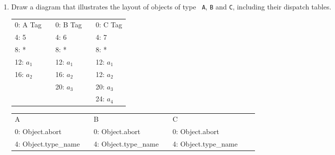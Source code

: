 \documentclass[10pt]{article}
\begin{document}
\begin{enumerate}
\begin{enumerate}
\item Draw a diagram that illustrates the layout of objects of type {\tt
A}, {\tt B} and {\tt C}, including their dispatch tables.
\begin{table}[h]
  \centering
  \begin{tabular}{llll|l|}
  \cline{1-1} \cline{3-3} \cline{5-5}
  \multicolumn{1}{|l|}{0: A Tag}  & \multicolumn{1}{l|}{} & \multicolumn{1}{l|}{0: B Tag}  &  & 0: C Tag  \\ \cline{1-1} \cline{3-3} \cline{5-5} 
  \multicolumn{1}{|l|}{4: 5}      & \multicolumn{1}{l|}{} & \multicolumn{1}{l|}{4: 6}      &  & 4: 7      \\ \cline{1-1} \cline{3-3} \cline{5-5} 
  \multicolumn{1}{|l|}{8: *}      & \multicolumn{1}{l|}{} & \multicolumn{1}{l|}{8: *}      &  & 8: *      \\ \cline{1-1} \cline{3-3} \cline{5-5} 
  \multicolumn{1}{|l|}{12: $a_1$} & \multicolumn{1}{l|}{} & \multicolumn{1}{l|}{12: $a_1$} &  & 12: $a_1$ \\ \cline{1-1} \cline{3-3} \cline{5-5} 
  \multicolumn{1}{|l|}{16: $a_2$} & \multicolumn{1}{l|}{} & \multicolumn{1}{l|}{16: $a_2$} &  & 12: $a_2$ \\ \cline{1-1} \cline{3-3} \cline{5-5} 
                                  & \multicolumn{1}{l|}{} & \multicolumn{1}{l|}{20: $a_3$} &  & 20: $a_3$ \\ \cline{3-3} \cline{5-5} 
                                  &                       &                                &  & 24: $a_4$ \\ \cline{5-5} 
  \end{tabular}
  \end{table}
  \begin{table}[h]
    \centering
    \begin{tabular}{lllllll}
    \cline{1-1} \cline{3-3} \cline{5-5}
    \multicolumn{1}{|l|}{A}                    & \multicolumn{1}{l|}{} & \multicolumn{1}{l|}{B}                    & \multicolumn{1}{l|}{} & \multicolumn{1}{l|}{C}                    &  &  \\ \cline{1-1} \cline{3-3} \cline{5-5}
    \multicolumn{1}{|l|}{0: Object.abort}      & \multicolumn{1}{l|}{} & \multicolumn{1}{l|}{0: Object.abort}      & \multicolumn{1}{l|}{} & \multicolumn{1}{l|}{0: Object.abort}      &  &  \\ \cline{1-1} \cline{3-3} \cline{5-5}
    \multicolumn{1}{|l|}{4: Object.type\_name} & \multicolumn{1}{l|}{} & \multicolumn{1}{l|}{4: Object.type\_name} & \multicolumn{1}{l|}{} & \multicolumn{1}{l|}{4: Object.type\_name} &  &  \\ \cline{1-1} \cline{3-3} \cline{5-5}

\end{tabular}
\end{table}
\end{enumerate}
\end{enumerate}
\end{document}
